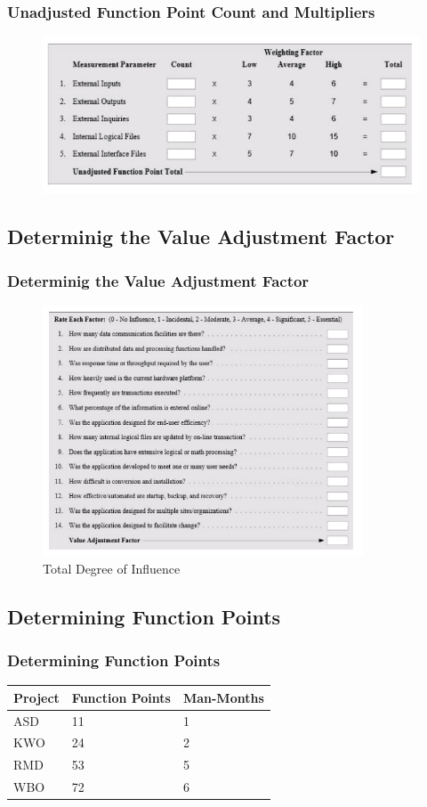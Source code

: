 \documentclass{beamer}
\begin{document}
\frame
{
	\frametitle{Unadjusted Function Point Count and Multipliers}
	\begin{figure}[h!]
  		\centering
    	\includegraphics[width=\textwidth]{../Images/FP.png}
	\end{figure}
}

\subsection{Determinig the Value Adjustment Factor}
\frame
{
	\frametitle{Determinig the Value Adjustment Factor}	
	\begin{figure}[h!]
  		\centering
    	\includegraphics[width=0.85\textwidth]{../Images/FP_2.png}
		\caption{Total Degree of Influence}
	\end{figure}
}

\subsection{Determining Function Points}
\frame
{
	\frametitle{Determining Function Points}
	\begin{tabular}{|l|l|l|}
	\hline
	Project & Function Points 	& Man-Months 	\\ \hline
	ASD 	& 11 				& 1				\\ \hline
	KWO 	& 24 				& 2				\\ \hline
	RMD 	& 53 				& 5				\\ \hline
	WBO 	& 72 				& 6				\\ \hline
	\end{tabular}
}
\end{document}
